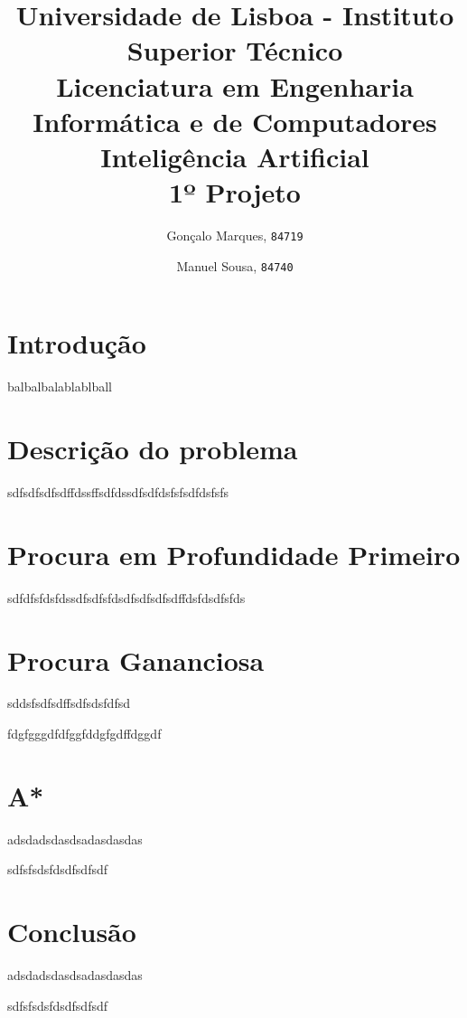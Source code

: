 \documentclass{scrartcl}
\begin{document}

\title{
	\textnormal{
	\LARGE Universidade de Lisboa - Instituto Superior Técnico\\
	\Large Licenciatura em Engenharia Informática e de Computadores\\
	\Large Inteligência Artificial
\\}
	\LARGE1º Projeto
	\vspace{-1ex}
	}
\author{Gonçalo Marques,
	\texttt{84719}
	\and
	Manuel Sousa,
	\texttt{84740}
}
\date{	\vspace{-1ex}
		\vspace{-4ex}
	}
\maketitle

\section*{Introdução}
balbalbalablablball

\section*{Descrição do problema}
sdfsdfsdfsdffdssffsdfdssdfsdfdsfsfsdfdsfsfs\par

\section*{Procura em Profundidade Primeiro}
sdfdfsfdsfdssdfsdfsfdsdfsdfsdfsdffdsfdsdfsfds\par

\section*{Procura Gananciosa}
sddsfsdfsdffsdfsdsfdfsd\par

fdgfgggdfdfggfddgfgdffdggdf

\section*{A*}
adsdadsdasdsadasdasdas

sdfsfsdsfdsdfsdfsdf

\section*{Conclusão}
adsdadsdasdsadasdasdas

sdfsfsdsfdsdfsdfsdf
\end{document}
